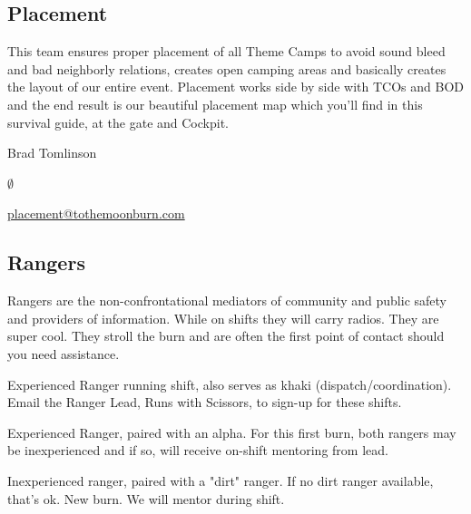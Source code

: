 \begin{multicols}{2}
\subsection*{Placement}
This team ensures proper placement of all Theme Camps to avoid sound bleed and bad neighborly relations, creates open camping areas and basically creates the layout of our entire event. Placement works side by side with TCOs and BOD and the end result is our beautiful placement map which you'll find in this survival guide, at the gate and Cockpit. 
\begin{description}[leftmargin=6em,noitemsep,style=nextline]
   \item[Lead:] Brad Tomlinson
   \item[Co-leads:] $\emptyset$
   \item[Contact:] \url{placement@tothemoonburn.com}
\end{description}


\subsection*{Rangers}
Rangers are the non-confrontational mediators of community and public safety and providers of information. While on shifts they will carry radios. They are super cool. They stroll the burn and are often the first point of contact should you need assistance.

\begin{addmargin}[.3cm]{0cm}
\begin{description}[noitemsep]
	\item[Khaki:] Experienced Ranger running shift, also serves as khaki (dispatch/coordination). Email the Ranger Lead, Runs with Scissors, to sign-up for these shifts.
	\item[Dirt Patrol:] Experienced Ranger, paired with an alpha. For this first burn, both rangers may be inexperienced and if so, will receive on-shift mentoring from lead.
	\item[Alpha:] Inexperienced ranger, paired with a "dirt" ranger. If no dirt ranger available, that's ok. New burn. We will mentor during shift.
\end{description}
\end{addmargin}


\end{multicols}
